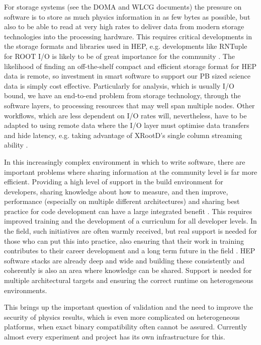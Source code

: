 For storage systems (see the DOMA and WLCG documents) the pressure on
software is to store as much physics information in as few bytes as
possible, but also to be able to read at very high rates to deliver data
from modern storage technologies into the processing hardware. This
requires critical developments in the storage formats and libraries used
in HEP, e.g. developments like RNTuple for ROOT I/O is likely to be of
great importance for the community \cite{ROOT-2020-HL-LHC}. The likelihood of finding an
off-the-shelf compact and efficient storage format for HEP data is
remote, so investment in smart software to support our PB sized science
data is simply cost effective. Particularly for analysis, which is
usually I/O bound, we have an end-to-end problem from storage
technology, through the software layers, to processing resources that
may well span multiple nodes. Other workflows, which are less dependent
on I/O rates will, nevertheless, have to be adapted to using remote data
where the I/O layer must optimise data transfers and hide latency, e.g.
taking advantage of XRootD's single column streaming ability \cite{xrootd}.

In this increasingly complex environment in which to write software,
there are important problems where sharing information at the community
level is far more efficient. Providing a high level of support in the
build environment for developers, sharing knowledge about how to
measure, and then improve, performance (especially on multiple different
architectures) and sharing best practice for code development can have a
large integrated benefit \cite{couturier2017hep}. This requires improved training and the
development of a curriculum for all developer levels. In the field, such
initiatives are often warmly received, but real support is needed for
those who can put this into practice, also ensuring that their work in
training contributes to their career development and a long term future
in the field \cite{foundation2018hep}. HEP software stacks are already deep and wide and building
these consistently and coherently is also an area where knowledge can be
shared. Support is needed for multiple architectural targets and
ensuring the correct runtime on heterogeneous environments.

This brings up the important question of validation and the need to
improve the security of physics results, which is even more complicated
on heterogeneous platforms, when exact binary compatibility often cannot
be assured. Currently almost every experiment and project has its own
infrastructure for this.

